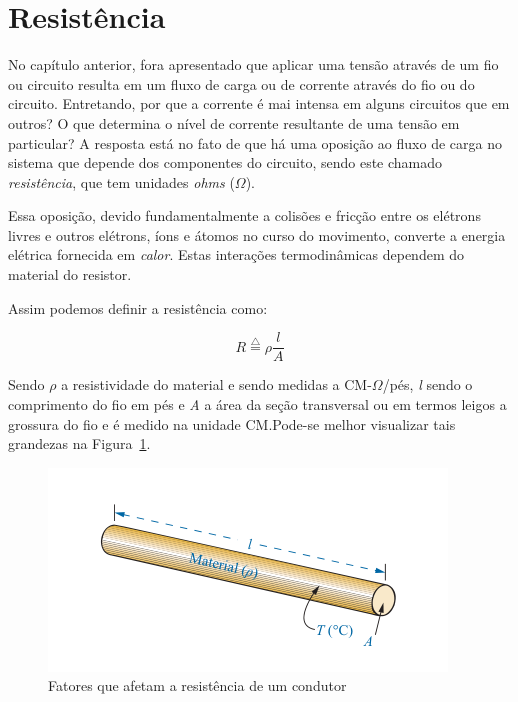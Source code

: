 \section{Resistência}

No capítulo anterior, fora apresentado que aplicar uma tensão através de um fio
ou circuito resulta em um fluxo de carga ou de corrente através do fio ou do
circuito. Entretando, por que a corrente é mai intensa em alguns circuitos que
em outros? O que determina o nível de corrente resultante de uma tensão em
particular? A resposta está no fato de que há uma oposição ao fluxo de carga no
sistema que depende dos componentes do circuito, sendo este chamado
\textit{resistência}, que tem unidades \textit{ohms} (\( \Omega \)).

Essa oposição, devido fundamentalmente a colisões e fricção entre os elétrons
livres e outros elétrons, íons e átomos no curso do movimento, converte a
energia elétrica fornecida em \textit{calor}. Estas interações termodinâmicas
dependem do material do resistor.

Assim podemos definir a resistência como:

\begin{equation}
	\label{eq:segunda-lei-de-ohm}
	R \overset{\triangle}{=} \rho \frac{l}{A}
\end{equation}

Sendo \textit{\( \rho \)} a resistividade do material e sendo medidas a CM-\(
\Omega \)/pés, \textit{l} sendo o comprimento do fio em pés e \textit{A} a área
da seção transversal ou em termos leigos a grossura do fio e é medido na unidade
CM.\@ Pode-se melhor visualizar tais grandezas na Figura~\ref{fig:fig4}.

\begin{figure}[H]
	\centering
	\setlength{\fboxsep}{0pt}
	\includegraphics[height=0.15\textwidth]{./fig/fig4.png}
	\caption{Fatores que afetam a resistência de um condutor}
	\label{fig:fig4}
\end{figure}

